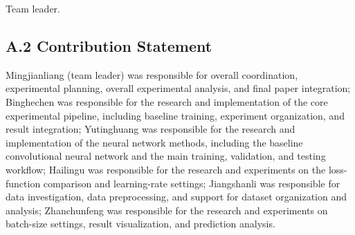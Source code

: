 \documentclass[conference]{IEEEtran}
\begin{document}
\noindent * Team leader.

\subsection*{A.2 Contribution Statement}

\noindent Mingjianliang (team leader) was responsible for overall coordination, experimental planning, overall experimental analysis, and final paper integration; Binghechen was responsible for the research and implementation of the core experimental pipeline, including baseline training, experiment organization, and result integration; Yutinghuang was responsible for the research and implementation of the neural network methods, including the baseline convolutional neural network and the main training, validation, and testing workflow; Hailingu was responsible for the research and experiments on the loss-function comparison and learning-rate settings; Jiangshanli was responsible for data investigation, data preprocessing, and support for dataset organization and analysis; Zhanchunfeng was responsible for the research and experiments on batch-size settings, result visualization, and prediction analysis.
\end{document}
